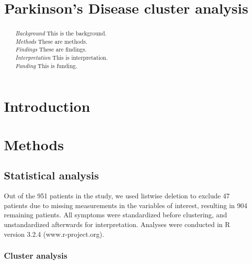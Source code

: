 \documentclass[preprint,5p]{elsarticle} %
\begin{document}
\begin{frontmatter}
\title{Parkinson's Disease cluster analysis}

\begin{abstract}
\emph{Background} \quad This is the background. \\
\emph{Methods} \quad  These are methods. \\
\emph{Findings} \quad These are findings. \\
\emph{Interpretation} \quad This is interpretation. \\
\emph{Funding} \quad This is funding.
\end{abstract}
\end{frontmatter}


\section{Introduction}

\section{Methods}

\subsection{Statistical analysis}

Out of the 951 patients in the study, we used listwise deletion to exclude 47 patients due to
missing measurements in the variables of interest, resulting in 904 remaining patients. All
symptoms were standardized before clustering, and unstandardized afterwards for
interpretation.
Analyses were conducted in R version 3.2.4 (www.r-project.org).

\subsubsection{Cluster analysis}
\end{document}
